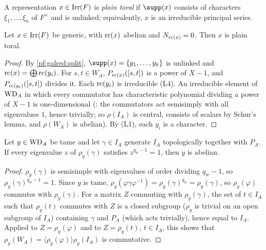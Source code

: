 A representation $x\in\operatorname{Irr}(F)$ is \emph{plain toral} if $\supp(x)$ consists of characters
$\xi_1,\dots,\xi_n$ of $F^\times$ and is unlinked; equivalently, $x$ is an irreducible principal series.

\begin{lemma}\label{pf:galred:plaintor}
Let $x\in\operatorname{Irr}(F)$ be generic, with $\mathrm{rc}(x)$ abelian and $N_{\mathrm{rc}(x)}=0$. Then $x$ is plain toral.
\end{lemma}

\begin{proof}
By \cref{pf:galred:split}, $\supp(x)=\{y_1,\dots,y_k\}$ is unlinked and $\mathrm{rc}(x)=\bigoplus\mathrm{rc}(y_i)$.
For $s,t\in W_A$, $P_{\mathrm{rc}(x)}([s,t])$ is a power of $X-1$, and $P_{\mathrm{rc}(y_i)}([s,t])$ divides it. Each
$\mathrm{rc}(y_i)$ is irreducible (L4). An irreducible element of $\mathrm{WD}_A$ in which every commutator has
characteristic polynomial dividing a power of $X-1$ is one-dimensional
(: the commutators act semisimply with all eigenvalues $1$, hence
trivially; so $\rho(I_A)$ is central, consists of scalars by Schur's lemma, and $\rho(W_A)$ is abelian). By (L1),
each $y_i$ is a character.
\end{proof}

\begin{lemma}\label{pf:galred:torfix}
Let $y\in\mathrm{WD}_A$ be tame and let $\gamma\in I_A$ generate $I_A$ topologically together with $P_A$. If every
eigenvalue $z$ of $\rho_y(\gamma)$ satisfies $z^{q_w-1}=1$, then $y$ is abelian.
\end{lemma}

\begin{proof}
$\rho_y(\gamma)$ is semisimple with eigenvalues of order dividing $q_w-1$, so $\rho_y(\gamma)^{q_w-1}=1$. Since $y$ is
tame, $\rho_y(\varphi\gamma\varphi^{-1})=\rho_y(\gamma)^{q_w}=\rho_y(\gamma)$, so $\rho_y(\varphi)$ commutes with
$\rho_y(\gamma)$. For a matrix $Z$ commuting with $\rho_y(\gamma)$, the set of $t\in I_A$ such that $\rho_y(t)$ commutes
with $Z$ is a closed subgroup ($\rho_y$ is trivial on an open subgroup of $I_A$) containing $\gamma$ and $P_A$ (which acts
trivially), hence equal to $I_A$. Applied to $Z=\rho_y(\varphi)$ and to $Z=\rho_y(t)$, $t\in I_A$, this shows that
$\rho_y(W_A)=\langle\rho_y(\varphi)\rangle\rho_y(I_A)$ is commutative.
\end{proof}

